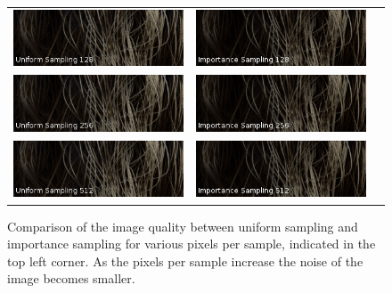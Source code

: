 \documentclass[11pt,a4paper]{report}
\begin{document}
\begin{figure}
\begin{center}
\begin{tabular}{ccc}
\includegraphics[scale=0.57]{variance-results/un128.png} & \includegraphics[scale=0.57]{variance-results/is128.png} \\
\includegraphics[scale=0.57]{variance-results/un256.png} & \includegraphics[scale=0.57]{variance-results/is256.png} \\
\includegraphics[scale=0.57]{variance-results/un512.png} & \includegraphics[scale=0.57]{variance-results/is512.png} \\

\end{tabular}
\egroup
\end{center}
\caption{Comparison of the image quality between uniform sampling and importance sampling for various pixels per sample, indicated in the top left corner. As the pixels per sample increase the noise of the image becomes smaller.}
\label{fig_side_by_side}
\end{figure}
\end{document}
